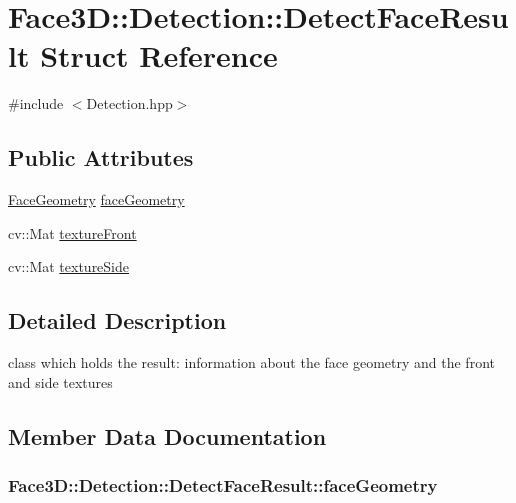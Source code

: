 \hypertarget{struct_face3_d_1_1_detection_1_1_detect_face_result}{}\section{Face3D\+:\+:Detection\+:\+:Detect\+Face\+Result Struct Reference}
\label{struct_face3_d_1_1_detection_1_1_detect_face_result}


{\ttfamily \#include $<$Detection.\+hpp$>$}

\subsection*{Public Attributes}
\begin{DoxyCompactItemize}
\item 
\hyperlink{class_face3_d_1_1_face_geometry}{Face\+Geometry} \hyperlink{struct_face3_d_1_1_detection_1_1_detect_face_result_acbc7132009d7bda34c42414c023a965e}{face\+Geometry}
\item 
cv\+::\+Mat \hyperlink{struct_face3_d_1_1_detection_1_1_detect_face_result_a2377f5ef21e5b7a4f1194ef42963f4c6}{texture\+Front}
\item 
cv\+::\+Mat \hyperlink{struct_face3_d_1_1_detection_1_1_detect_face_result_a2a38d56093e878bb3bd363583d1667a3}{texture\+Side}
\end{DoxyCompactItemize}


\subsection{Detailed Description}
class which holds the result\+: information about the face geometry and the front and side textures 

\subsection{Member Data Documentation}
\subsubsection[{\texorpdfstring{face\+Geometry}{faceGeometry}}]{ Face3\+D\+::\+Detection\+::\+Detect\+Face\+Result\+::face\+Geometry}\hypertarget{struct_face3_d_1_1_detection_1_1_detect_face_result_acbc7132009d7bda34c42414c023a965e}{}\label{struct_face3_d_1_1_detection_1_1_detect_face_result_acbc7132009d7bda34c42414c023a965e}
